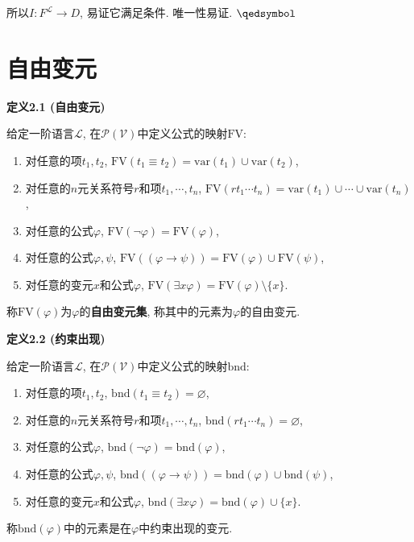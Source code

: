 所以$I:F^{\mathcal{L}}\to D$, 易证它满足条件. 唯一性易证. \hfill $\qedsymbol$





\newpage
\section{自由变元}

\hypertarget{sec:定义2.1}{}
\noindent\textbf{定义2.1 (自由变元)}

给定一阶语言$\mathcal{L}$, 在$\mathcal{P}(\mathcal{V})$中定义公式的映射$\mathrm{FV}$:
\begin{enumerate}
    \item 对任意的项$t_1,t_2$,
    $\mathrm{FV}(t_1\equiv t_2)=\mathrm{var}(t_1)\cup\mathrm{var}(t_2)$,
    \item 对任意的$n$元关系符号$r$和项$t_1,\cdots,t_n$,
    $\mathrm{FV}(rt_1\cdots t_n)=\mathrm{var}(t_1)\cup\cdots\cup\mathrm{var}(t_n)$,
    \item 对任意的公式$\varphi$,
    $\mathrm{FV}(\neg\varphi)=\mathrm{FV}(\varphi)$,
    \item 对任意的公式$\varphi,\psi$,
    $\mathrm{FV}((\varphi\to\psi))=\mathrm{FV}(\varphi)\cup\mathrm{FV}(\psi)$,
    \item 对任意的变元$x$和公式$\varphi$,
    $\mathrm{FV}(\exists x\varphi)=\mathrm{FV}(\varphi)\setminus\{x\}$.
\end{enumerate}
称$\mathrm{FV}(\varphi)$为$\varphi$的\textbf{自由变元集},
称其中的元素为$\varphi$的自由变元.

\vspace{10pt}

\hypertarget{sec:定义2.2}{}
\noindent\textbf{定义2.2 (约束出现)}

给定一阶语言$\mathcal{L}$, 在$\mathcal{P}(\mathcal{V})$中定义公式的映射$\mathrm{bnd}$:
\begin{enumerate}
    \item 对任意的项$t_1,t_2$,
    $\mathrm{bnd}(t_1\equiv t_2)=\varnothing$,
    \item 对任意的$n$元关系符号$r$和项$t_1,\cdots,t_n$,
    $\mathrm{bnd}(rt_1\cdots t_n)=\varnothing$,
    \item 对任意的公式$\varphi$,
    $\mathrm{bnd}(\neg\varphi)=\mathrm{bnd}(\varphi)$,
    \item 对任意的公式$\varphi,\psi$,
    $\mathrm{bnd}((\varphi\to\psi))=\mathrm{bnd}(\varphi)\cup\mathrm{bnd}(\psi)$,
    \item 对任意的变元$x$和公式$\varphi$,
    $\mathrm{bnd}(\exists x\varphi)=\mathrm{bnd}(\varphi)\cup\{x\}$.
\end{enumerate}
称$\mathrm{bnd}(\varphi)$中的元素是在$\varphi$中约束出现的变元.

